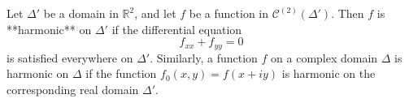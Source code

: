 Let $\Delta'$ be a domain in $\mathbb{R}^2$, and let $f$ be a function in $\mathcal{C}^{(2)}(\Delta')$. Then $f$ is **harmonic** on $\Delta'$ if the differential equation
$$f_{xx} + f_{yy} = 0$$
is satisfied everywhere on $\Delta'$. Similarly, a function $f$ on a complex domain $\Delta$ is harmonic on $\Delta$ if the function $f_0(x, y) = f(x + iy)$ is harmonic on the corresponding real domain $\Delta'$.
